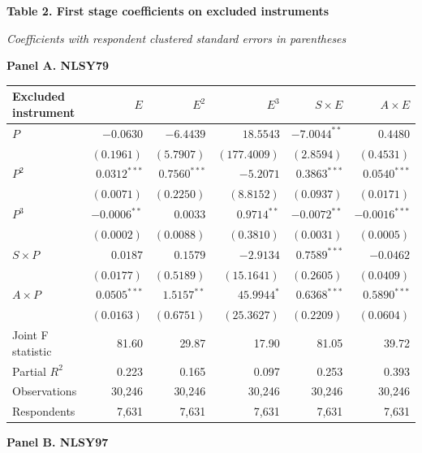 \begin{center}
{\large\bfseries Table 2. First stage coefficients on excluded instruments}\par
\smallskip
\textit{Coefficients with respondent clustered standard errors in parentheses}\par
\medskip
\end{center}
\small
\noindent\textbf{Panel A. NLSY79}\par\smallskip
\noindent\begin{tabular*}{\textwidth}{@{\extracolsep{\fill}}lrrrrr@{}}
\toprule
Excluded instrument & $E$ & $E^2$ & $E^3$ & $S\times E$ & $A\times E$ \\
\midrule
$P$ & $-0.0630$ & $-6.4439$ & $18.5543$ & $-7.0044^{**}$ & $0.4480$ \\
 & $(0.1961)$ & $(5.7907)$ & $(177.4009)$ & $(2.8594)$ & $(0.4531)$ \\[2pt]
$P^2$ & $0.0312^{***}$ & $0.7560^{***}$ & $-5.2071$ & $0.3863^{***}$ & $0.0540^{***}$ \\
 & $(0.0071)$ & $(0.2250)$ & $(8.8152)$ & $(0.0937)$ & $(0.0171)$ \\[2pt]
$P^3$ & $-0.0006^{**}$ & $0.0033$ & $0.9714^{**}$ & $-0.0072^{**}$ & $-0.0016^{***}$ \\
 & $(0.0002)$ & $(0.0088)$ & $(0.3810)$ & $(0.0031)$ & $(0.0005)$ \\[2pt]
$S\times P$ & $0.0187$ & $0.1579$ & $-2.9134$ & $0.7589^{***}$ & $-0.0462$ \\
 & $(0.0177)$ & $(0.5189)$ & $(15.1641)$ & $(0.2605)$ & $(0.0409)$ \\[2pt]
$A\times P$ & $0.0505^{***}$ & $1.5157^{**}$ & $45.9944^{*}$ & $0.6368^{***}$ & $0.5890^{***}$ \\
 & $(0.0163)$ & $(0.6751)$ & $(25.3627)$ & $(0.2209)$ & $(0.0604)$ \\[2pt]
\midrule
Joint F statistic & 81.60 & 29.87 & 17.90 & 81.05 & 39.72 \\
Partial $R^2$ & 0.223 & 0.165 & 0.097 & 0.253 & 0.393 \\
Observations & 30,246 & 30,246 & 30,246 & 30,246 & 30,246 \\
Respondents & 7,631 & 7,631 & 7,631 & 7,631 & 7,631 \\
\bottomrule
\end{tabular*}\par\smallskip
\medskip
\noindent\textbf{Panel B. NLSY97}\par\smallskip
